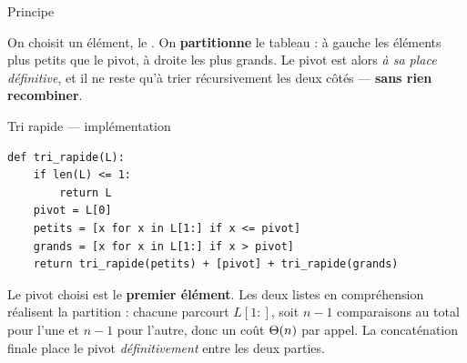 \documentclass[11pt,aspectratio=169]{beamer}
\begin{document}
\begin{frame}{Principe}
\begin{encadre}
On choisit un élément, le . On \textbf{partitionne} le tableau :
à gauche les éléments plus petits que le pivot, à droite les plus grands.
Le pivot est alors \emph{à sa place définitive}, et il ne reste qu'à trier
récursivement les deux côtés --- \textbf{sans rien recombiner}.
\end{encadre}
\vspace{6pt}
\begin{center}
\end{center}
\end{frame}

\begin{frame}[fragile]{Tri rapide --- implémentation}
\begin{lstlisting}
def tri_rapide(L):
    if len(L) <= 1:
        return L
    pivot = L[0]
    petits = [x for x in L[1:] if x <= pivot]
    grands = [x for x in L[1:] if x > pivot]
    return tri_rapide(petits) + [pivot] + tri_rapide(grands)
\end{lstlisting}
\begin{encadre}\small
Le pivot choisi est le \textbf{premier élément}. Les deux listes en compréhension
réalisent la partition : chacune parcourt $L[1:]$, soit $n-1$ comparaisons au total
pour l'une et $n-1$ pour l'autre, donc un coût $\Theta(n)$ par appel.
La concaténation finale place le pivot \emph{définitivement} entre les deux parties.
\end{encadre}
\end{frame}
\end{document}

